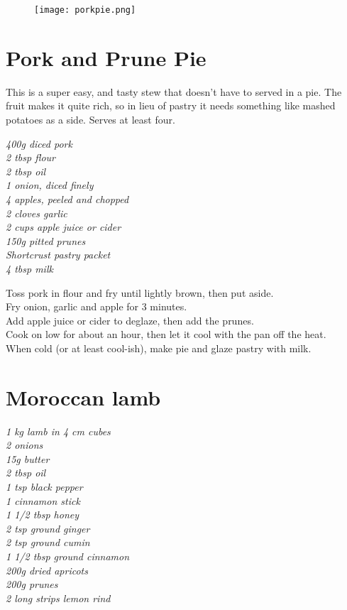 \documentclass{tufte-book}
\begin{document}
\newpage

\begin{figure}[h]
  \texttt{[image: porkpie.png]}
\end{figure}

\section{Pork and Prune Pie}

This is a super easy, and tasty stew that doesn't have to served in a pie. The fruit makes it quite rich, so in lieu of pastry it needs something like mashed potatoes as a side. Serves at least four.

\smallskip
\emph{400g diced pork
\\2 tbsp flour
\\2 tbsp oil
\\1 onion, diced finely
\\4 apples, peeled and chopped
\\2 cloves garlic
\\2 cups apple juice or cider
\\150g pitted prunes
\\Shortcrust pastry packet
\\4 tbsp milk}

\smallskip
Toss pork in flour and fry until lightly brown, then put aside.
\\Fry onion, garlic and apple for 3 minutes.
\\Add apple juice or cider to deglaze, then add the prunes.
\\Cook on low for about an hour, then let it cool with the pan off the heat.
\\When cold (or at least cool-ish), make pie and glaze pastry with milk.

\newpage

\section{Moroccan lamb}

\emph{1 kg lamb in 4 cm cubes
\\2 onions
\\15g butter
\\2 tbsp oil
\\1 tsp black pepper
\\1 cinnamon stick
\\1 1/2 tbsp honey
\\2 tsp ground ginger
\\2 tsp ground cumin
\\1 1/2 tbsp ground cinnamon
\\200g dried apricots
\\200g prunes
\\2 long strips lemon rind}
\end{document}
